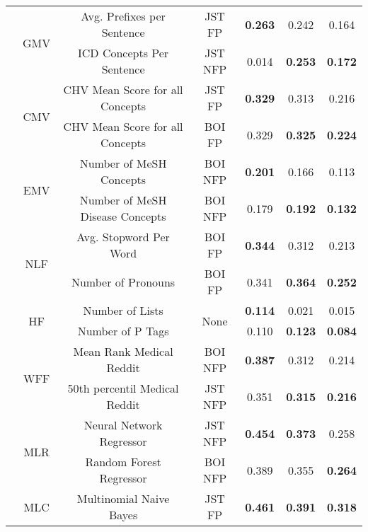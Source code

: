 \begin{table}[t]
{\begin{tabular}{c|c|c|c|c|c|c}
\cmidrule{2-7} 
 & \multirow{2}{*}{GMV} & Avg. Prefixes per Sentence & JST FP & \textbf{0.263} & 0.242 & 0.164\tabularnewline
 &  & ICD Concepts Per Sentence & JST NFP & 0.014 & \textbf{0.253} & \textbf{0.172}\tabularnewline
\cmidrule{2-7} 
 & \multirow{2}{*}{CMV} & CHV Mean Score for all Concepts & JST FP & \textbf{0.329} & 0.313 & 0.216\tabularnewline
 &  & CHV Mean Score for all Concepts & BOI FP & 0.329 & \textbf{0.325} & \textbf{0.224}\tabularnewline
\cmidrule{2-7} 
 & \multirow{2}{*}{EMV} & Number of MeSH Concepts & BOI NFP & \textbf{0.201} & 0.166 & 0.113\tabularnewline
 &  & Number of MeSH Disease Concepts & BOI NFP & 0.179 & \textbf{0.192} & \textbf{0.132}\tabularnewline
\cmidrule{2-7} 
 & \multirow{2}{*}{NLF} & Avg. Stopword Per Word & BOI FP & \textbf{0.344} & 0.312 & 0.213\tabularnewline
 &  & Number of Pronouns & BOI FP & 0.341 & \textbf{0.364} & \textbf{0.252}\tabularnewline
\cmidrule{2-7} 
& \multirow{2}{*}{HF} & Number of Lists & \multirow{2}{*}{None} & \textbf{0.114} & 0.021 & 0.015\tabularnewline
 &  & Number of P Tags &  & 0.110 & \textbf{0.123} & \textbf{0.084}\tabularnewline
\cmidrule{2-7} 
 & \multirow{2}{*}{WFF} & Mean Rank Medical Reddit & BOI NFP & \textbf{0.387} & 0.312 & 0.214\tabularnewline
 &  & 50th percentil Medical Reddit & JST NFP & 0.351 & \textbf{0.315} & \textbf{0.216}\tabularnewline
\cmidrule{2-7} 
 & \multirow{2}{*}{MLR} & Neural Network Regressor & JST NFP & \textbf{0.454} & \textbf{0.373} & 0.258\tabularnewline
 &  & Random Forest Regressor & BOI NFP & 0.389 & 0.355 & \textbf{0.264}\tabularnewline
\cmidrule{2-7} 
 & MLC & Multinomial Naive Bayes & JST FP & \textbf{0.461} & \textbf{0.391} & \textbf{0.318}\tabularnewline
\bottomrule
\end{tabular}
} %
\end{table}
